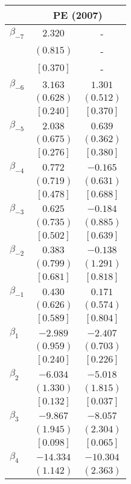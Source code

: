 \documentclass[12pt]{article}
\begin{document}
\begin{table}[H]
\centering
\label{tab:young_black_event_study_PE}
\begin{tabular}{lcc}
\toprule
& \multicolumn{2}{c}{PE (2007)} \\
\cmidrule(lr){2-3}
\midrule
$\beta_{-7}$ & $  2.320$ & - \\
& $(  0.815)$ & - \\
& $[  0.370]$ & - \\
$\beta_{-6}$ & $  3.163$ & $  1.301$ \\
& $(  0.628)$ & $(  0.512)$ \\
& $[  0.240]$ & $[  0.370]$ \\
$\beta_{-5}$ & $  2.038$ & $  0.639$ \\
& $(  0.675)$ & $(  0.362)$ \\
& $[  0.276]$ & $[  0.380]$ \\
$\beta_{-4}$ & $  0.772$ & $ -0.165$ \\
& $(  0.719)$ & $(  0.631)$ \\
& $[  0.478]$ & $[  0.688]$ \\
$\beta_{-3}$ & $  0.625$ & $ -0.184$ \\
& $(  0.735)$ & $(  0.885)$ \\
& $[  0.502]$ & $[  0.639]$ \\
$\beta_{-2}$ & $  0.383$ & $ -0.138$ \\
& $(  0.799)$ & $(  1.291)$ \\
& $[  0.681]$ & $[  0.818]$ \\
$\beta_{-1}$ & $  0.430$ & $  0.171$ \\
& $(  0.626)$ & $(  0.574)$ \\
& $[  0.589]$ & $[  0.804]$ \\
$\beta_{1}$ & $ -2.989$ & $ -2.407$ \\
& $(  0.959)$ & $(  0.703)$ \\
& $[  0.240]$ & $[  0.226]$ \\
$\beta_{2}$ & $ -6.034$ & $ -5.018$ \\
& $(  1.330)$ & $(  1.815)$ \\
& $[  0.132]$ & $[  0.037]$ \\
$\beta_{3}$ & $ -9.867$ & $ -8.057$ \\
& $(  1.945)$ & $(  2.304)$ \\
& $[  0.098]$ & $[  0.065]$ \\
$\beta_{4}$ & $-14.334$ & $-10.304$ \\
& $(  1.142)$ & $(  2.363)$ \\

\end{tabular}
\end{table}
\end{document}
